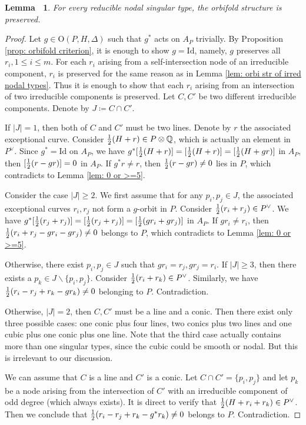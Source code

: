 \documentclass[12pt,reqno,a4paper]{amsart}
\newtheorem{lem}[thm]{Lemma~}
\theoremstyle{remark}
\theoremstyle{definition}
\begin{document}
\begin{lem}
\label{lem: orbi str of reducible types}
    For every reducible nodal singular type, the orbifold structure is preserved.
\end{lem}
\begin{proof}
    Let $g\in\mathrm{O}(P,H,\Delta)$ such that $g^*$ acts on $A_P$ trivially.
    By Proposition \ref{prop: orbifold criterion}, it is enough to show $g=\mathrm{Id}$, namely, $g$ preserves all $r_i, 1\le i\le m$. 
    For each $r_i$ arising from a self-intersection node of an irreducible component, $r_i$ is preserved for the same reason as in Lemma \ref{lem: orbi str of irred nodal types}.
    Thus it is enough to show that each $r_i$ arising from an intersection of two irreducible components is preserved.
    Let $C,C'$ be two different irreducible components.
    Denote by $J\coloneqq C\cap C'$.
    
    If $|J|=1$, then both of $C$ and $C'$ must be two lines.
    Denote by $r$ the associated exceptional curve.
    Consider ${1\over2}(H+r)\in P\otimes\mathbb{Q}$, which is actually an element in $P^\vee$.
    Since $g^*=\mathrm{Id}$ on $A_P$, we have $g^*[{1\over2}(H+r)]=[{1\over2}(H+r)]=[{1\over2}(H+g r)]$ in $A_P$, then $[{1\over2}(r-g r)]=0$ in $A_P$.
    If $g^*r\ne r$, then ${1\over2}(r-g r)\ne 0$ lies in $P$, which contradicts to Lemma \ref{lem: 0 or >=5}.

    Consider the case $|J|\ge 2$.
    We first assume that for any $p_i,p_j\in J$, the associated exceptional curves $r_i, r_j$ not form a $g$-orbit in $P$.
    Consider ${1\over2}(r_i+r_j)\in P^\vee$.
    We have $g^*[{1\over2}(r_j+r_j)]=[{1\over2}(r_j+r_j)]=[{1\over2}(g r_i+g r_j)]$ in $A_P$.
    If $g r_i\ne r_i$, then ${1\over2}(r_i+r_j-g r_i-g r_j)\ne 0$ belongs to $P$, which contradicts to Lemma \ref{lem: 0 or >=5}.

    Otherwise, there exist $p_i,p_j\in J$ such that $g r_i=r_j, g r_j=r_i$.
    If $|J|\ge 3$, then there exists a $p_k\in J\backslash\{p_i,p_j\}$.
    Consider ${1\over2}(r_i+r_k)\in P^\vee$.
    Similarly, we have ${1\over2}(r_i-r_j+r_k-g r_k)\ne 0$ belonging to $P$. Contradiction.

    Otherwise, $|J|=2$, then $C,C'$ must be a line and a conic.
    Then there exist only three possible cases: one conic plus four lines, two conics plus two lines and one cubic plus one conic plus one line.
    Note that the third case actually contains more than one singular types, since the cubic could be smooth or nodal. 
    But this is irrelevant to our discussion.

    We can assume that $C$ is a line and $C'$ is a conic.
    Let $C\cap C'=\{p_i,p_j\}$ and let $p_k$ be a node arising from the intersection of $C'$ with an irreducible component of odd degree (which always exists).
    It is direct to verify that ${1\over2}(H+r_i+r_k)\in P^\vee$.
    Then we conclude that ${1\over2}(r_i-r_j+r_k-g^*r_k)\ne 0$ belongs to $P$.
    Contradiction.
\end{proof}
\end{document}
